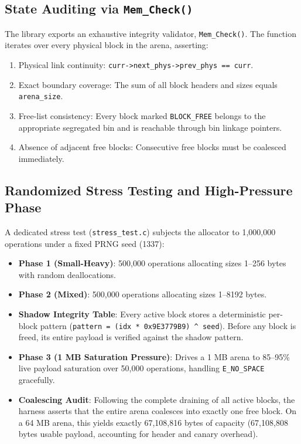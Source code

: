 \documentclass[11pt,a4paper]{article}
\begin{document}
\subsection{State Auditing via \texttt{Mem\_Check()}}
The library exports an exhaustive integrity validator, \texttt{Mem\_Check()}. The function iterates over every physical block in the arena, asserting:
\begin{enumerate}
    \item Physical link continuity: \texttt{curr->next\_phys->prev\_phys == curr}.
    \item Exact boundary coverage: The sum of all block headers and sizes equals \texttt{arena\_size}.
    \item Free-list consistency: Every block marked \texttt{BLOCK\_FREE} belongs to the appropriate segregated bin and is reachable through bin linkage pointers.
    \item Absence of adjacent free blocks: Consecutive free blocks must be coalesced immediately.
\end{enumerate}

\subsection{Randomized Stress Testing and High-Pressure Phase}
A dedicated stress test (\texttt{stress\_test.c}) subjects the allocator to 1,000,000 operations under a fixed PRNG seed (1337):
\begin{itemize}
    \item \textbf{Phase 1 (Small-Heavy)}: 500,000 operations allocating sizes 1--256 bytes with random deallocations.
    \item \textbf{Phase 2 (Mixed)}: 500,000 operations allocating sizes 1--8192 bytes.
    \item \textbf{Shadow Integrity Table}: Every active block stores a deterministic per-block pattern (\texttt{pattern = (idx * 0x9E3779B9) \^{} seed}). Before any block is freed, its entire payload is verified against the shadow pattern.
    \item \textbf{Phase 3 (1 MB Saturation Pressure)}: Drives a 1 MB arena to 85--95\% live payload saturation over 50,000 operations, handling \texttt{E\_NO\_SPACE} gracefully.
    \item \textbf{Coalescing Audit}: Following the complete draining of all active blocks, the harness asserts that the entire arena coalesces into exactly one free block. On a 64 MB arena, this yields exactly 67,108,816 bytes of capacity (67,108,808 bytes usable payload, accounting for header and canary overhead).
\end{itemize}
\end{document}
